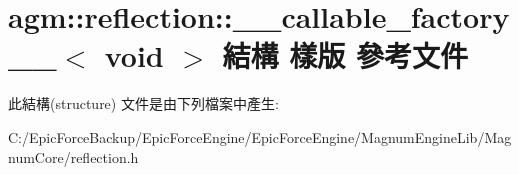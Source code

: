 \hypertarget{structagm_1_1reflection_1_1____callable__factory_____3_01void_01_4}{}\section{agm\+:\+:reflection\+:\+:\+\_\+\+\_\+callable\+\_\+factory\+\_\+\+\_\+$<$ void $>$ 結構 樣版 參考文件}
\label{structagm_1_1reflection_1_1____callable__factory_____3_01void_01_4}


此結構(structure) 文件是由下列檔案中產生\+:\begin{DoxyCompactItemize}
\item 
C\+:/\+Epic\+Force\+Backup/\+Epic\+Force\+Engine/\+Epic\+Force\+Engine/\+Magnum\+Engine\+Lib/\+Magnum\+Core/reflection.\+h\end{DoxyCompactItemize}
